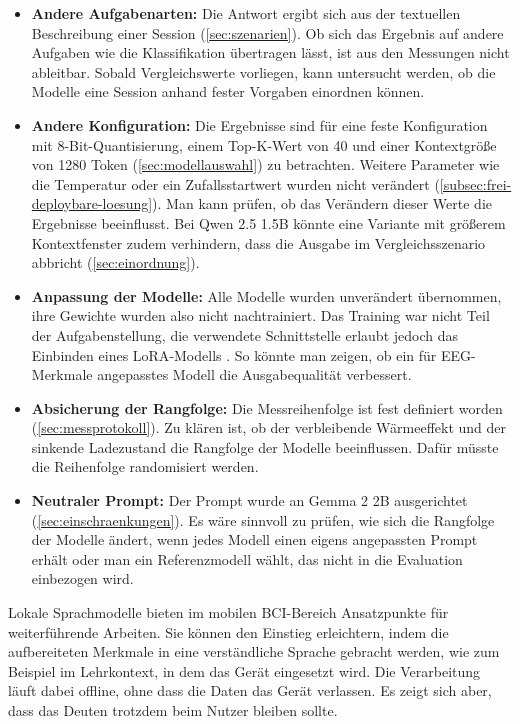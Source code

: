 \begin{itemize}
    \item \textbf{Andere Aufgabenarten:} Die Antwort ergibt sich aus der textuellen Beschreibung einer Session (\autoref{sec:szenarien}). Ob sich das Ergebnis auf andere Aufgaben wie die Klassifikation übertragen lässt, ist aus den Messungen nicht ableitbar. Sobald Vergleichswerte vorliegen, kann untersucht werden, ob die Modelle eine Session anhand fester Vorgaben einordnen können.
    \item \textbf{Andere Konfiguration:} Die Ergebnisse sind für eine feste Konfiguration mit 8-Bit-Quantisierung, einem Top-K-Wert von 40 und einer Kontextgröße von 1280 Token (\autoref{sec:modellauswahl}) zu betrachten. Weitere Parameter wie die Temperatur oder ein Zufallsstartwert wurden nicht verändert (\autoref{subsec:frei-deploybare-loesung}). Man kann prüfen, ob das Verändern dieser Werte die Ergebnisse beeinflusst. Bei Qwen 2.5 1.5B könnte eine Variante mit größerem Kontextfenster zudem verhindern, dass die Ausgabe im Vergleichsszenario abbricht (\autoref{sec:einordnung}).
    \item \textbf{Anpassung der Modelle:} Alle Modelle wurden unverändert übernommen, ihre Gewichte wurden also nicht nachtrainiert. Das Training war nicht Teil der Aufgabenstellung, die verwendete Schnittstelle erlaubt jedoch das Einbinden eines \ac{LoRA}-Modells \autocite{mediapipe_llm}. So könnte man zeigen, ob ein für \ac{EEG}-Merkmale angepasstes Modell die Ausgabequalität verbessert.
    \item \textbf{Absicherung der Rangfolge:} Die Messreihenfolge ist fest definiert worden (\autoref{sec:messprotokoll}). Zu klären ist, ob der verbleibende Wärmeeffekt und der sinkende Ladezustand die Rangfolge der Modelle beeinflussen. Dafür müsste die Reihenfolge randomisiert werden.
    \item \textbf{Neutraler Prompt:} Der Prompt wurde an Gemma 2 2B ausgerichtet (\autoref{sec:einschraenkungen}). Es wäre sinnvoll zu prüfen, wie sich die Rangfolge der Modelle ändert, wenn jedes Modell einen eigens angepassten Prompt erhält oder man ein Referenzmodell wählt, das nicht in die Evaluation einbezogen wird.
\end{itemize}

\noindent Lokale Sprachmodelle bieten im mobilen \ac{BCI}-Bereich Ansatzpunkte für weiterführende Arbeiten. Sie können den Einstieg erleichtern, indem die aufbereiteten Merkmale in eine verständliche Sprache gebracht werden, wie zum Beispiel im Lehrkontext, in dem das Gerät eingesetzt wird. Die Verarbeitung läuft dabei offline, ohne dass die Daten das Gerät verlassen. Es zeigt sich aber, dass das Deuten trotzdem beim Nutzer bleiben sollte.
